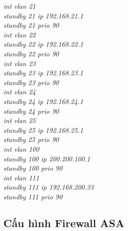 \documentclass[a4paper, 12pt]{article}
\begin{document}
\hspace*{2cm}\textit{int vlan 21\\
\hspace*{2cm}standby 21 ip 192.168.21.1\\
\hspace*{2cm}standby 21 prio 90\\
\hspace*{2cm}int vlan 22\\
\hspace*{2cm}standby 22 ip 192.168.22.1\\
\hspace*{2cm}standby 22 prio 90\\
\hspace*{2cm}int vlan 23\\
\hspace*{2cm}standby 23 ip 192.168.23.1\\
\hspace*{2cm}standby 23 prio 90\\
\hspace*{2cm}int vlan 24\\
\hspace*{2cm}standby 24 ip 192.168.24.1\\
\hspace*{2cm}standby 24 prio 90\\
\hspace*{2cm}int vlan 25\\
\hspace*{2cm}standby 25 ip 192.168.25.1\\
\hspace*{2cm}standby 25 prio 90\\
\hspace*{2cm}int vlan 100\\
\hspace*{2cm}standby 100 ip 200.200.100.1\\
\hspace*{2cm}standby 100 prio 90\\
\hspace*{2cm}int vlan 111\\
\hspace*{2cm}standby 111 ip 192.168.200.33\\
\hspace*{2cm}standby 111 prio 90\\}
\subsection{Cấu hình Firewall ASA}
\end{document}
